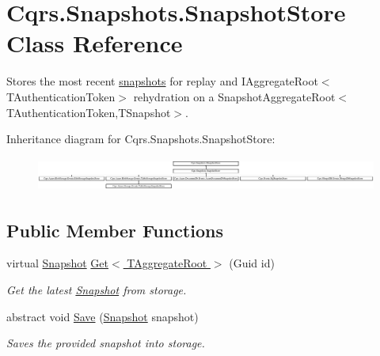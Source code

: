 \hypertarget{classCqrs_1_1Snapshots_1_1SnapshotStore}{}\section{Cqrs.\+Snapshots.\+Snapshot\+Store Class Reference}
\label{classCqrs_1_1Snapshots_1_1SnapshotStore}


Stores the most recent \hyperlink{classCqrs_1_1Snapshots_1_1Snapshot}{snapshots} for replay and I\+Aggregate\+Root$<$\+T\+Authentication\+Token$>$ rehydration on a Snapshot\+Aggregate\+Root$<$\+T\+Authentication\+Token,\+T\+Snapshot$>$.  


Inheritance diagram for Cqrs.\+Snapshots.\+Snapshot\+Store\+:\begin{figure}[H]
\begin{center}
\leavevmode
\includegraphics[height=1.137056cm]{classCqrs_1_1Snapshots_1_1SnapshotStore}
\end{center}
\end{figure}
\subsection*{Public Member Functions}
\begin{DoxyCompactItemize}
\item 
virtual \hyperlink{classCqrs_1_1Snapshots_1_1Snapshot}{Snapshot} \hyperlink{classCqrs_1_1Snapshots_1_1SnapshotStore_af35423c44786c31d224d52c3796d0d3d_af35423c44786c31d224d52c3796d0d3d}{Get$<$ T\+Aggregate\+Root $>$} (Guid id)
\begin{DoxyCompactList}\small\item\em Get the latest \hyperlink{classCqrs_1_1Snapshots_1_1Snapshot}{Snapshot} from storage. \end{DoxyCompactList}\item 
abstract void \hyperlink{classCqrs_1_1Snapshots_1_1SnapshotStore_ae96ea2bb89a0bd7f45544acc37107525_ae96ea2bb89a0bd7f45544acc37107525}{Save} (\hyperlink{classCqrs_1_1Snapshots_1_1Snapshot}{Snapshot} snapshot)
\begin{DoxyCompactList}\small\item\em Saves the provided {\itshape snapshot}  into storage. \end{DoxyCompactList}\end{DoxyCompactItemize}
